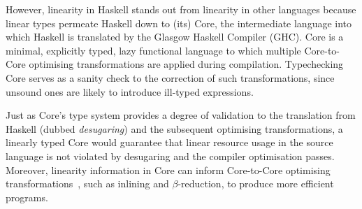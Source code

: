 \documentclass[acmsmall,review,anonymous,screen]{acmart}
\begin{document}
However, linearity in Haskell stands out from linearity in other
languages because linear types permeate Haskell down to (its) Core, the
intermediate language into which Haskell is translated by the Glasgow Haskell Compiler (GHC).
%
Core is a minimal, explicitly typed, lazy functional language to which multiple
Core-to-Core optimising transformations are applied during compilation.
%
Typechecking Core serves as a sanity check to the correction of such
transformations, since unsound ones are likely to introduce ill-typed
expressions. %
%
%



Just as Core's type system provides a degree of validation to the
translation from Haskell (dubbed \emph{desugaring}) and the subsequent
optimising transformations, a linearly typed Core would guarantee that
linear resource usage in the source language is not violated by desugaring
and the compiler optimisation passes. Moreover, linearity information in
Core can inform Core-to-Core optimising 
transformations~\cite{cite:let-floating,peytonjones1997a,cite:linearhaskell},
such as inlining and $\beta$-reduction, to produce more efficient programs.
%
%
\end{document}
